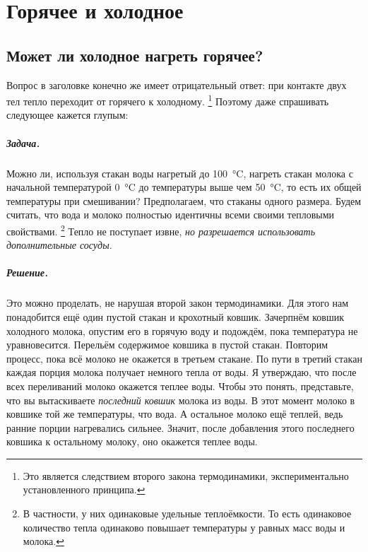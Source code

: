 \chapter{Горячее и холодное}

\section{Может ли холодное нагреть горячее?}

Вопрос в заголовке конечно же имеет отрицательный ответ: при контакте двух тел тепло переходит от горячего к холодному.%
\footnote{Это является следствием второго закона термодинамики, экспериментально установленного принципа.}
Поэтому даже спрашивать следующее кажется глупым:

\paragraph{Задача.}
Можно ли, используя стакан воды нагретый до 100~°C, нагреть стакан молока с начальной температурой 0~°C до температуры выше чем 50~°C, то есть их общей температуры при смешивании?
Предполагаем, что стаканы одного размера.
Будем считать, что вода и молоко полностью идентичны всеми своими тепловыми свойствами.%
\footnote{В частности, у них одинаковые удельные теплоёмкости. То есть одинаковое количество тепла одинаково повышает температуры у равных масс воды и молока.}
Тепло не поступает извне, \emph{но разрешается использовать дополнительные сосуды.}

\paragraph{Решение.}
Это можно проделать, не нарушая второй закон термодинамики.
Для этого нам понадобится ещё один пустой стакан и крохотный ковшик.
Зачерпнём ковшик холодного молока, опустим его в горячую воду и подождём, пока температура не уравновесится.
Перельём содержимое ковшика в пустой стакан.
Повторим процесс, пока всё молоко не окажется в третьем стакане.
По пути в третий стакан каждая порция молока получает немного тепла от воды.
Я утверждаю, что после всех переливаний молоко окажется теплее воды.
Чтобы это понять, представьте, что вы вытаскиваете \emph{последний ковшик} молока из воды.
В этот момент молоко в ковшике той же температуры, что вода.
А остальное молоко ещё теплей, ведь ранние порции нагревались сильнее.
Значит, после добавления этого последнего ковшика к остальному молоку, оно окажется теплее воды.

